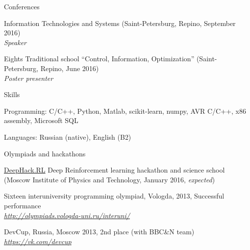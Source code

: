 \documentclass{resume} %
\begin{document}
\begin{rSection}{Conferences}
\item Information Technologies and Systems (Saint-Petersburg, Repino, September 2016)\\
{\em Speaker}
\item Eights Traditional school “Control, Information, Optimization” (Saint-Petersburg, Repino, June 2016)\\
{\em Poster presenter}
\end{rSection}

\begin{rSection}{Skills}
\item Programming: C/C++, Python, Matlab, scikit-learn, numpy, AVR C/C++, x86 assembly, Microsoft SQL
\item Languages: Russian (native), English (B2)
\end{rSection}


\begin{rSection}{Olympiads and hackathons}
\item \href{http://rl.deephack.me/}{DeepHack.RL} Deep Reinforcement learning hackathon and science school (Moscow Institute of Physics and Technology, January 2016, {\em expected})
\item Sixteen interuniversity programming olympiad, Vologda, 2013, Successful performance \\
\hfill {\em \url{http://olympiads.vologda-uni.ru/interuni/}}
\item DevCup, Russia, Moscow 2013, 2nd place (with BBC\&N team)\\
\hfill {\em \url{https://vk.com/devcup}}
\end{rSection}
\end{document}
